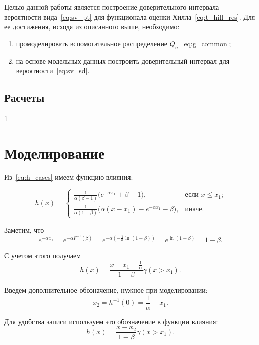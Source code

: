 \documentclass[12pt, specialist, subf, substylefile = spbu.rtx]{disser}
\begin{document}
Целью данной работы является построение доверительного интервала вероятности вида~\eqref{eq:sv_pt} для функционала оценки Хилла~\eqref{eq:t_hill_res}. Для ее достижения, исходя из описанного выше, необходимо:

\begin{enumerate}
\item промоделировать вспомогательное распределение $Q_n$~\eqref{eq:g_common};

\item на основе модельных данных построить доверительный интервал для вероятности~\eqref{eq:sv_sd}.

\end{enumerate}

\subsection{Расчеты}

1

\section{Моделирование}

Из~\eqref{eq:h_cases} имеем функцию влияния:

\begin{equation*}
h(x)=
\begin{cases}
\frac{1}{\alpha(\beta-1)}\big(e^{-\alpha x_1} +\beta-1\big),
	&\text{если $x \le x_1$;}\\
\frac{1}{\alpha(1-\beta)}\big(\alpha(x-x_1)- e^{-\alpha x_1}-\beta\big),
	&\text{иначе.}
\end{cases}
\end{equation*}

Заметим, что 
$$
e^{-\alpha x_1}=
e^{-\alpha F^{-1}(\beta)}=
e^{-\alpha \left(-\frac{1}{\alpha}\ln(1-\beta)\right)}=
e^{\ln(1-\beta)}=
1-\beta.
$$

С учетом этого получаем
\begin{equation*}
h(x)=\frac{x-x_1-\frac{1}{\alpha}}{1-\beta}\gamma(x>x_1).
\end{equation*}

Введем дополнительное обозначение, нужное при моделировании:
$$
x_2=h^{-1}(0)=\frac{1}{\alpha}+x_1.
$$

Для удобства записи используем это обозначение в функции влияния:
\begin{equation*}
h(x)=\frac{x-x_2}{1-\beta}\gamma(x>x_1).
\end{equation*}
\end{document}

